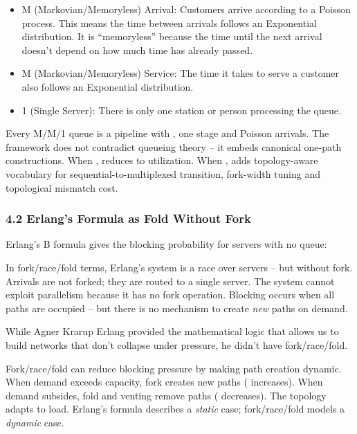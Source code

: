 \documentclass[
]{article}
\providecommand{\tightlist}{%
  \setlength{\itemsep}{0pt}\setlength{\parskip}{0pt}}
\begin{document}
\begin{itemize}
\tightlist
\item
  M (Markovian/Memoryless) Arrival: Customers arrive according to a
  Poisson process. This means the time between arrivals follows an
  Exponential distribution. It is ``memoryless'' because the time until
  the next arrival doesn't depend on how much time has already passed.\\
\item
  M (Markovian/Memoryless) Service: The time it takes to serve a
  customer also follows an Exponential distribution.\\
\item
  1 (Single Server): There is only one station or person processing the
  queue.
\end{itemize}

Every M/M/1 queue is a pipeline with , one stage and Poisson arrivals.
The framework does not contradict queueing theory -- it embeds canonical
one-path constructions. When , reduces to utilization. When , adds
topology-aware vocabulary for sequential-to-multiplexed transition,
fork-width tuning and topological mismatch cost.

\subsubsection{\texorpdfstring{\textbf{4.2 Erlang's Formula as Fold
Without
Fork}}{4.2 Erlang's Formula as Fold Without Fork}}\label{erlangs-formula-as-fold-without-fork}

Erlang's B formula gives the blocking probability for servers with no
queue:

In fork/race/fold terms, Erlang's system is a race over servers -- but
without fork. Arrivals are not forked; they are routed to a single
server. The system cannot exploit parallelism because it has no fork
operation. Blocking occurs when all paths are occupied -- but there is
no mechanism to create \emph{new} paths on demand.

While Agner Krarup Erlang provided the mathematical logic that allows us
to build networks that don't collapse under pressure, he didn't have
fork/race/fold.

Fork/race/fold can reduce blocking pressure by making path creation
dynamic. When demand exceeds capacity, fork creates new paths (
increases). When demand subsides, fold and venting remove paths (
decreases). The topology adapts to load. Erlang's formula describes a
\emph{static} case; fork/race/fold models a \emph{dynamic} case.
\end{document}
